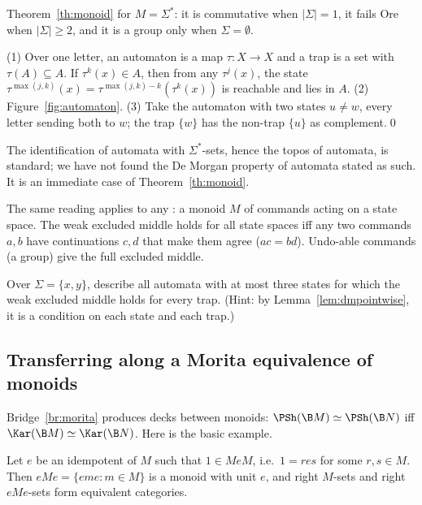 \gen{} Theorem~\ref{th:monoid} for $M = \Sigma^*$: it is commutative when $|\Sigma| = 1$, it fails Ore when $|\Sigma|\ge 2$, and it is a group only when $\Sigma = \emptyset$.

\direct{} (1) Over one letter, an automaton is a map $\tau : X\to X$ and a trap is a set with $\tau(A)\subseteq A$. If $\tau^k(x)\in A$, then from any $\tau^j(x)$, the state $\tau^{\max(j,k)}(x) = \tau^{\max(j,k)-k}(\tau^k(x))$ is reachable and lies in $A$. (2) Figure~\ref{fig:automaton}. (3) Take the automaton with two states $u\neq w$, every letter sending both to $w$; the trap $\{w\}$ has the non-trap $\{u\}$ as complement.\qed

\status{} The identification of automata with $\Sigma^*$-sets, hence the topos of automata, is standard; we have not found the De Morgan property of automata stated as such. It is an immediate case of Theorem~\ref{th:monoid}.

\begin{remark}
The same reading applies to any : a monoid $M$ of commands acting on a state space. The weak excluded middle holds for all state spaces iff any two commands $a,b$ have continuations $c,d$ that make them agree ($ac = bd$). Undo-able commands (a group) give the full excluded middle.
\end{remark}

\begin{exercise}\label{exo:automata}
Over $\Sigma = \{x,y\}$, describe all automata with at most three states for which the weak excluded middle holds for every trap. (Hint: by Lemma~\ref{lem:dmpointwise}, it is a condition on each state and each trap.)
\end{exercise}

\subsection{Transferring along a Morita equivalence of monoids}\label{ssec:transfer}

Bridge~\ref{br:morita} produces decks between monoids: $\PSh(\B M)\simeq\PSh(\B N)$ iff $\Kar(\B M)\simeq\Kar(\B N)$. Here is the basic example.

\begin{lemma}\label{lem:corner}
Let $e$ be an idempotent of $M$ such that $1\in MeM$, i.e.\ $1 = res$ for some $r,s\in M$. Then $eMe = \{eme : m\in M\}$ is a monoid with unit $e$, and right $M$-sets and right $eMe$-sets form equivalent categories.
\end{lemma}

